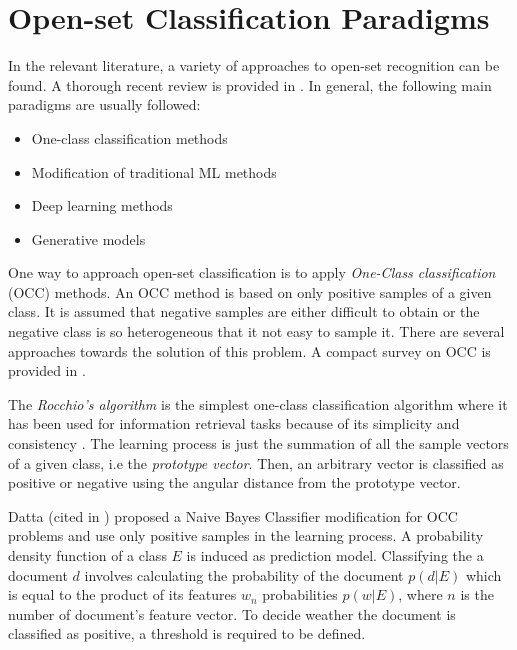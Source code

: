 \section{Open-set Classification Paradigms}
\label{chap:openset:sec:Open_Set_Classification_Paradigms}

In the relevant literature, a variety of approaches to open-set recognition can be found. A thorough recent review is provided in \parencite{geng2018recent}. In general, the following main paradigms are usually followed:

\begin{itemize}
    \item One-class classification methods
    \item Modification of traditional ML methods
    \item Deep learning methods
    \item Generative models
\end{itemize}

One way to approach open-set classification is to apply \textit{One-Class classification} (OCC) methods. An OCC method is based on only positive samples of a given class. It is assumed that negative samples are either difficult to obtain or the negative class is so heterogeneous that it not easy to sample it. There are several approaches towards the solution of this problem. A compact survey on OCC is provided in \parencite{khan2010survey}. 

The \textit{Rocchio's algorithm} is the simplest one-class classification algorithm where it has been used for information retrieval tasks because of its simplicity and consistency \parencite{joachims1997probabilistic}. The learning process is just the summation of all the sample vectors of a given class, i.e the \textit{prototype vector}. Then, an arbitrary vector is classified as positive or negative using the angular distance from the prototype vector.

Datta (cited in \parencite{manevitz2002one}) proposed a Naive Bayes Classifier modification for OCC problems and use only positive samples in the learning process. A probability density function of a class $E$ is induced as prediction model. Classifying the a document $d$ involves calculating the probability of the document $p(d|E)$ which is equal to the product of its features $w_{n}$ probabilities $p(w|E)$, where $n$ is the number of document's feature vector. To decide weather the document is classified as positive, a threshold is required to be defined. 

